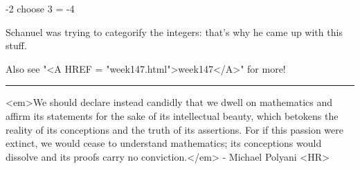-2 choose 3 = -4

Schanuel was trying to categorify the integers: that's
why he came up with this stuff.

Also see "<A HREF = "week147.html">week147</A>" for more!
$$
    


\par\noindent\rule{\textwidth}{0.4pt}
<em>We should declare instead candidly that we dwell on mathematics and 
affirm its statements for the sake of its intellectual beauty, which 
betokens the reality of its conceptions and the truth of its assertions. 
For if this passion were extinct, we would cease to understand mathematics; 
its conceptions would dissolve and its proofs carry no conviction.</em> - 
Michael Polyani
<HR>



